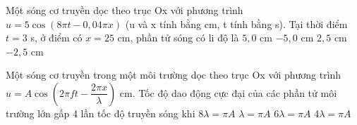 \begin{ex}%
Một sóng cơ truyền dọc theo trục Ox với phương trình $u = 5\cos(8\pi t - 0,04\pi x)$ (u và x tính bằng cm, t tính bằng s). Tại thời điểm $t = 3$ s, ở điểm có $x = 25$ cm, phần tử sóng có li độ là
\choice
{$5,0$ cm}
{\True $-5,0$ cm}
{$2,5$ cm}
{$-2,5$ cm}

\end{ex} 






\begin{ex}%
Một sóng cơ truyền trong một môi trường dọc theo trục Ox với phương trình $u=A\cos \left( 2\pi ft-\dfrac{2\pi x}{\lambda } \right)$ cm. Tốc độ dao động cực đại của các phần tử môi trường lớn gấp 4 lần tốc độ truyền sóng khi
\choice
{8$\lambda = \pi A$}
{$\lambda = \pi A$}
{6$\lambda = \pi A$}
{4$\lambda = \pi A$}
\end{ex} 





























